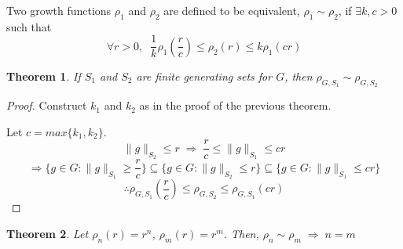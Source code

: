 \documentclass{article}
\newtheorem*{theorem}{Theorem}
\begin{document}
Two growth functions $\rho_1$ and $\rho_2$ are defined to be equivalent, $\rho_1\sim\rho_2$, if $\exists k,c>0$ such that \[\forall r>0,\;\; \frac{1}{k}\rho_1(\frac{r}{c})\leq \rho_2(r)\leq k\rho_1(cr)\]
\begin{theorem}
If $S_1$ and $S_2$ are finite generating sets for $G$, then $\rho_{G,S_1}\sim\rho_{G,S_2}$
\end{theorem}
\begin{proof}
Construct $k_1$ and $k_2$ as in the proof of the previous theorem.

Let $c=max\{k_1,k_2\}$.
\[\|g\|_{S_2}\leq r\;\Rightarrow\;\frac{r}{c}\leq\|g\|_{S_1}\leq cr\]
\[\Rightarrow\{g\in G:\|g\|_{S_1}\geq \frac{r}{c}\}\subseteq\{g\in G:\|g\|_{S_2}\leq r\}\subseteq\{g\in G:\|g\|_{S_1}\leq cr\}\]
\[\therefore\rho_{G,S_1}(\frac{r}{c})\leq\rho_{G,S_2}\leq\rho_{G,S_1}(cr)\]
\end{proof}
\begin{theorem}
Let $\rho_n(r)=r^n$, $\rho_m(r)=r^m$. Then, $\rho_n\sim\rho_m\;\Rightarrow\;n=m$
\end{theorem}
\end{document}
